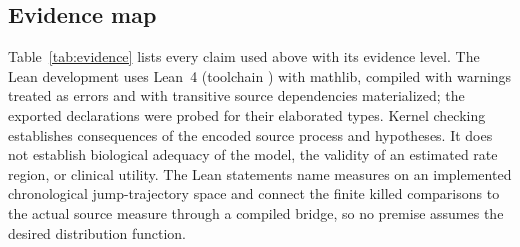\documentclass[11pt,a4paper]{article}
\theoremstyle{plain}
\theoremstyle{definition}
\theoremstyle{remark}
\begin{document}
\subsection{Evidence map}
Table~\ref{tab:evidence} lists every claim used above with its evidence level. The Lean development uses Lean~4 (toolchain ) with mathlib, compiled with warnings treated as errors and with transitive source dependencies materialized; the exported declarations were probed for their elaborated types. Kernel checking establishes consequences of the encoded source process and hypotheses. It does not establish biological adequacy of the model, the validity of an estimated rate region, or clinical utility. The Lean statements name measures on an implemented chronological jump-trajectory space and connect the finite killed comparisons to the actual source measure through a compiled bridge, so no premise assumes the desired distribution function.
\end{document}
